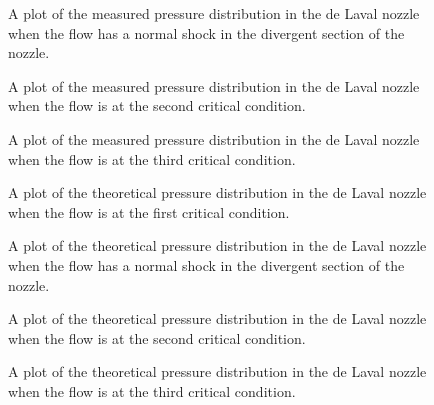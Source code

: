 \begin{figure}[htpb]
    \centering
    
    \caption{A plot of the measured pressure distribution in the de Laval nozzle when the flow has a normal shock in the divergent section of the nozzle.}
    \label{fig:measured_pressure_normal_shock}
\end{figure}

\begin{figure}[htpb]
    \centering
    
    \caption{A plot of the measured pressure distribution in the de Laval nozzle when the flow is at the second critical condition.}
    \label{fig:measured_pressure_2nd_critical}
\end{figure}

\begin{figure}[htpb]
    \centering
    
    \caption{A plot of the measured pressure distribution in the de Laval nozzle when the flow is at the third critical condition.}
    \label{fig:measured_pressure_3rd_critical}
\end{figure}

\begin{figure}[htpb]
    \centering
    
    \caption{A plot of the theoretical pressure distribution in the de Laval nozzle when the flow is at the first critical condition.}
    \label{fig:theoretical_pressure_1st_critical}
\end{figure}

\begin{figure}[htpb]
    \centering
    
    \caption{A plot of the theoretical pressure distribution in the de Laval nozzle when the flow has a normal shock in the divergent section of the nozzle.}
    \label{fig:theoretical_pressure_normal_shock}
\end{figure}


\begin{figure}[htpb]
    \centering
    
    \caption{A plot of the theoretical pressure distribution in the de Laval nozzle when the flow is at the second critical condition.}
    \label{fig:theoretical_pressure_2nd_critical}
\end{figure}

\begin{figure}[htpb]
    \centering
    
    \caption{A plot of the theoretical pressure distribution in the de Laval nozzle when the flow is at the third critical condition.}
    \label{fig:theoretical_pressure_3rd_critical}
\end{figure}
